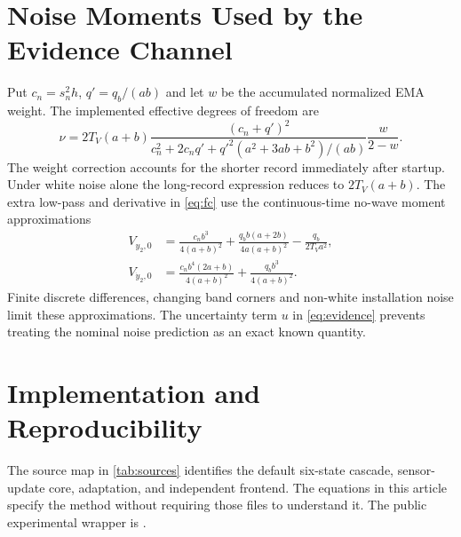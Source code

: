 \documentclass[conference]{IEEEtran}
\begin{document}
\section{Noise Moments Used by the Evidence Channel}
\label{app:evidence}
Put $c_n=s_n^2h$, $q'=q_b/(ab)$ and let $w$ be the accumulated normalized
EMA weight. The implemented effective degrees of freedom are
\begin{equation}
 \nu=2T_V(a+b)\frac{(c_n+q')^2}
 {c_n^2+2c_nq'+q'^2(a^2+3ab+b^2)/(ab)}\frac{w}{2-w}.
 \label{eq:nu}
\end{equation}
The weight correction accounts for the shorter record immediately after
startup. Under white noise alone the long-record expression reduces to
$2T_V(a+b)$. The extra low-pass and derivative in \cref{eq:fc} use
the continuous-time no-wave moment approximations
\begin{align}
 V_{y_2,0}&=\frac{c_n b^3}{4(a+b)^2}
       +\frac{q_b b(a+2b)}{4a(a+b)^2}-\frac{q_b}{2T_Va^2},\nonumber\\
 V_{\dot y_2,0}&=\frac{c_n b^4(2a+b)}{4(a+b)^2}
                       +\frac{q_b b^3}{4(a+b)^2}.
 \label{eq:noisemoments}
\end{align}
Finite discrete differences, changing band corners and non-white
installation noise limit these approximations. The uncertainty term $u$
in \cref{eq:evidence} prevents treating the nominal noise prediction as
an exact known quantity.

\section{Implementation and Reproducibility}
\label{app:implementation}
The source map in \cref{tab:sources} identifies the default six-state
cascade, sensor-update core, adaptation, and independent frontend.
The equations in this article specify the method without requiring those
files to understand it. The public experimental wrapper is
.
\end{document}
